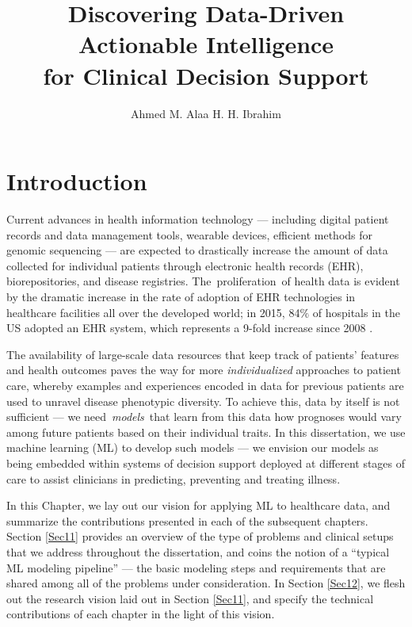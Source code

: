 \documentclass [PhD] {uclathes}
\title          {Discovering Data-Driven Actionable Intelligence\\
for Clinical Decision Support}
\author         {Ahmed M. Alaa H. H. Ibrahim}
\begin{document}
\makeintropages

%
%

\chapter{Introduction}
Current advances in health information technology --- including digital patient records and data management tools, wearable devices, efficient methods for genomic sequencing --- are expected to drastically increase the amount of data collected for individual patients through electronic health records (EHR), biorepositories, and disease registries. The~proliferation~of health data is evident by the dramatic increase in the rate of adoption of EHR technologies in healthcare facilities all over the developed world; in 2015, 84$\%$ of hospitals in the US adopted an EHR system, which represents a 9-fold increase since 2008 \cite{desalvo2015us}.

The availability of large-scale data resources that keep track of patients' features and health outcomes paves the way for more \textit{individualized} approaches to patient care, whereby examples and experiences encoded in data for previous patients are used to unravel disease phenotypic diversity. To achieve this, data by itself is not sufficient --- we need~\textit{models}~that learn from this data how prognoses would vary among future patients based on their individual traits. In this dissertation, we use machine learning (ML) to develop such models --- we envision our models as being embedded within systems of decision support deployed at different stages of care to assist clinicians in predicting, preventing and treating illness. 

In this Chapter, we lay out our vision for applying ML to healthcare data, and summarize the contributions presented in each of the subsequent chapters. Section \ref{Sec11} provides an overview of the type of problems and clinical setups that we address throughout the dissertation, and coins the notion of a ``typical ML modeling pipeline'' --- the basic modeling steps and requirements that are shared among all of the problems under consideration. In Section \ref{Sec12}, we flesh out the research vision laid out in Section \ref{Sec11}, and specify the technical contributions of each chapter in the light of this vision.  
\end{document}
